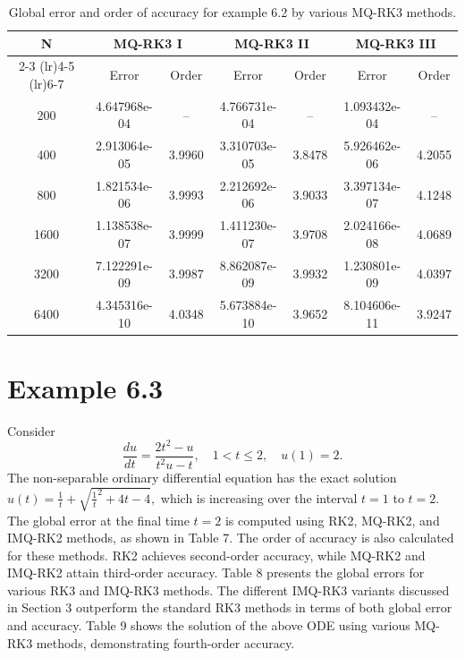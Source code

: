 \documentclass[a4paper, preprint,11pt]{elsarticle}
\numberwithin{equation}{section}
\begin{document}
\begin{table}[htbp!]
    \centering
    \caption{Global error and order of accuracy for example 6.2 by various MQ-RK3 methods.}
    \begin{tabular}{c c c c c c c}
        \toprule
        N & \multicolumn{2}{c}{MQ-RK3 I}  & \multicolumn{2}{c}{MQ-RK3 II} & \multicolumn{2}{c}{MQ-RK3 III} \\
        \cmidrule(lr){2-3} \cmidrule(lr){4-5}  \cmidrule(lr){6-7}
          & Error & Order & Error & Order & Error & Order \\
        \midrule
        200  & 4.647968e-04    & -- &4.766731e-04 & -- & 1.093432e-04    & --    \\
        400  &2.913064e-05    &3.9960 & 3.310703e-05 &  3.8478 &  5.926462e-06  &  4.2055 \\
        800  &1.821534e-06    &   3.9993 & 2.212692e-06   & 3.9033 &  3.397134e-07 &  4.1248 \\
        1600  & 1.138538e-07      &   3.9999 &  1.411230e-07  & 3.9708&  2.024166e-08     &   4.0689 \\
        3200 &  7.122291e-09 &  3.9987& 8.862087e-09&  3.9932 &  1.230801e-09   & 4.0397 \\
        6400 & 4.345316e-10   &  4.0348 & 5.673884e-10     &  3.9652&  8.104606e-11  & 3.9247\\
        \bottomrule
    \end{tabular}
\end{table}
\section*{Example 6.3}
Consider
\begin{equation*}
    \frac{du}{dt} =  \frac{2t^2 - u}{t^2u-t}, \quad 1 < t \leq 2, \quad
    u(1) = 2.
\end{equation*}
The non-separable ordinary differential equation has the exact solution 
$u(t) = \frac{1}{t} + \sqrt{\frac{1}{t}^2 + 4t -4},$ which is increasing over the interval $t = 1$ to $t = 2$. The global error at the final time $t = 2$ is computed using RK2, MQ-RK2, and IMQ-RK2 methods, as shown in Table 7. The order of accuracy is also calculated for these methods. RK2 achieves second-order accuracy, while MQ-RK2 and IMQ-RK2 attain third-order accuracy. Table 8 presents the global errors for various RK3 and IMQ-RK3 methods. The different IMQ-RK3 variants discussed in Section 3 outperform the standard RK3 methods in terms of both global error and accuracy. Table 9 shows the solution of the above ODE using various MQ-RK3 methods, demonstrating fourth-order accuracy.
\end{document}
